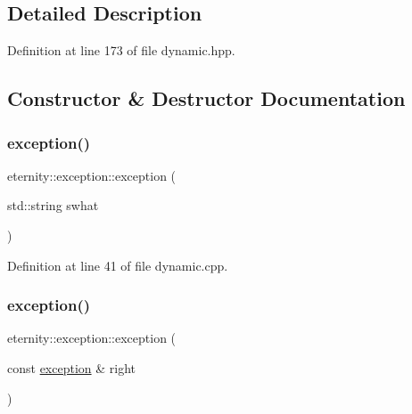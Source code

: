 \subsection{Detailed Description}


Definition at line 173 of file dynamic.\+hpp.



\subsection{Constructor \& Destructor Documentation}
\mbox{\label{classeternity_1_1exception_a681b708eb4c5870221307180d685ea0f}} 
\subsubsection{\texorpdfstring{exception()}{exception()}\hspace{0.1cm}{\footnotesize\ttfamily [1/2]}}
{\footnotesize\ttfamily eternity\+::exception\+::exception (\begin{DoxyParamCaption}\item[{std\+::string}]{swhat }\end{DoxyParamCaption})}



Definition at line 41 of file dynamic.\+cpp.

\mbox{\label{classeternity_1_1exception_a68454ae0f538c10f63380c6d9954acab}} 
\subsubsection{\texorpdfstring{exception()}{exception()}\hspace{0.1cm}{\footnotesize\ttfamily [2/2]}}
{\footnotesize\ttfamily eternity\+::exception\+::exception (\begin{DoxyParamCaption}\item[{const \hyperlink{classeternity_1_1exception}{exception} \&}]{right }\end{DoxyParamCaption})\hspace{0.3cm}{\ttfamily [inline]}}



